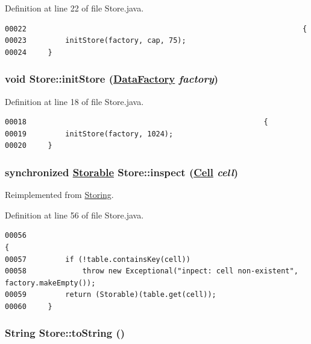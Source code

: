 Definition at line 22 of file Store.java.\footnotesize\begin{verbatim}00022                                                                {
00023         initStore(factory, cap, 75);
00024     }
\end{verbatim}\normalsize 
\hypertarget{classStore_d0}{
\subsubsection[initStore]{\setlength{\rightskip}{0pt plus 5cm}void Store::init\-Store (\hyperlink{interfaceDataFactory}{Data\-Factory} {\em factory})}}
\label{classStore_d0}




Definition at line 18 of file Store.java.\footnotesize\begin{verbatim}00018                                                       {
00019         initStore(factory, 1024);
00020     }
\end{verbatim}\normalsize 
\hypertarget{classStore_a3}{
\subsubsection[inspect]{\setlength{\rightskip}{0pt plus 5cm}synchronized \hyperlink{interfaceStorable}{Storable} Store::inspect (\hyperlink{interfaceCell}{Cell} {\em cell})}}
\label{classStore_a3}




Reimplemented from \hyperlink{interfaceStoring_a3}{Storing}.

Definition at line 56 of file Store.java.\footnotesize\begin{verbatim}00056                                                                        {
00057         if (!table.containsKey(cell)) 
00058             throw new Exceptional("inpect: cell non-existent", factory.makeEmpty());
00059         return (Storable)(table.get(cell));
00060     }
\end{verbatim}\normalsize 
\hypertarget{classStore_a4}{
\subsubsection[toString]{\setlength{\rightskip}{0pt plus 5cm}String Store::to\-String ()}}
\label{classStore_a4}




